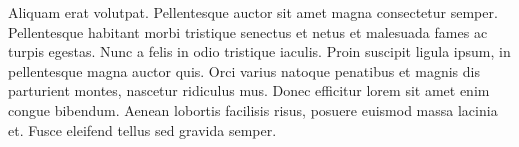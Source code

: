 Aliquam erat volutpat. Pellentesque auctor sit amet magna consectetur semper. Pellentesque habitant morbi tristique senectus et netus et malesuada fames ac turpis egestas. Nunc a felis in odio tristique iaculis. Proin suscipit ligula ipsum, in pellentesque magna auctor quis. Orci varius natoque penatibus et magnis dis parturient montes, nascetur ridiculus mus. Donec efficitur lorem sit amet enim congue bibendum. Aenean lobortis facilisis risus, posuere euismod massa lacinia et. Fusce eleifend tellus sed gravida semper.
